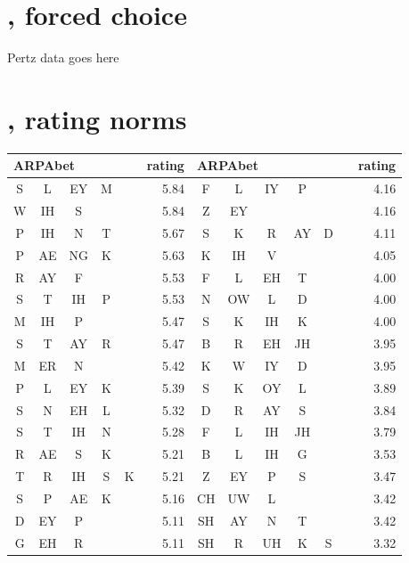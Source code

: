 \section{\citet{Pertz1975}, forced choice}

Pertz data goes here

\section{\citet{Albright2003b}, rating norms}

\begin{center}
\begin{longtable}{c@{ } c@{ } c@{ } c@{ } c@{ } r | c c c c c c r}
\toprule
\multicolumn{5}{l}{ARPAbet} & rating & \multicolumn{6}{l}{ARPAbet} & rating \\ 
\midrule
S  & L  & EY & M  &   & 5.84  & F  & L  & IY & P  &    &   & 4.16 \\
W  & IH & S  &    &   & 5.84  & Z  & EY &    &    &    &   & 4.16 \\
P  & IH & N  & T  &   & 5.67  & S  & K  & R  & AY & D  &   & 4.11 \\
P  & AE & NG & K  &   & 5.63  & K  & IH & V  &    &    &   & 4.05 \\
R  & AY & F  &    &   & 5.53  & F  & L  & EH & T  &    &   & 4.00 \\
S  & T  & IH & P  &   & 5.53  & N  & OW & L  & D  &    &   & 4.00 \\
M  & IH & P  &    &   & 5.47  & S  & K  & IH & K  &    &   & 4.00 \\
S  & T  & AY & R  &   & 5.47  & B  & R  & EH & JH &    &   & 3.95 \\
M  & ER & N  &    &   & 5.42  & K  & W  & IY & D  &    &   & 3.95 \\
P  & L  & EY & K  &   & 5.39  & S  & K  & OY & L  &    &   & 3.89 \\
S  & N  & EH & L  &   & 5.32  & D  & R  & AY & S  &    &   & 3.84 \\
S  & T  & IH & N  &   & 5.28  & F  & L  & IH & JH &    &   & 3.79 \\
R  & AE & S  & K  &   & 5.21  & B  & L  & IH & G  &    &   & 3.53 \\
T  & R  & IH & S  & K & 5.21  & Z  & EY & P  & S  &    &   & 3.47 \\
S  & P  & AE & K  &   & 5.16  & CH & UW & L  &    &    &   & 3.42 \\ 
D  & EY & P  &    &   & 5.11  & SH & AY & N  & T  &    &   & 3.42 \\ 
G  & EH & R  &    &   & 5.11  & SH & R  & UH & K  & S  &   & 3.32 \\

\end{longtable}
\end{center}
